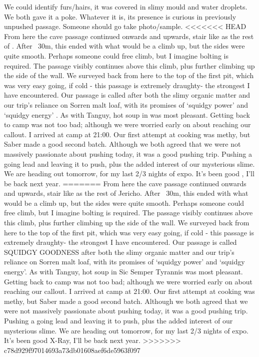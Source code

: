 We could identify furs/hairs, it was covered in slimy mould and water droplets. We both gave it a poke. Whatever it is, its presence is curious in previously unpushed passage. Someone should go take photo/sample.
<<<<<<< HEAD
From here the cave passage continued onwards and upwards, stair like as the rest of . After ~30m, this ended with what would be a climb up, but the sides were quite smooth. Perhaps someone could free climb, but I imagine bolting is required. The passage visibly continues above this climb, plus further climbing up the side of the wall. We surveyed back from here to  the top of the first pit, which was very easy going, if cold  - this passage is extremely draughty- the strongest I have encountered. Our passage is called   after both the slimy organic matter and our trip’s reliance on Sorren malt loaf, with its promises of ‘squidgy power’ and ‘squidgy energy’ . As with Tanguy, hot soup in  was most pleasant.
Getting back to camp was not too bad; although we were worried early on about reaching our callout. I arrived at camp at 21:00. Our first attempt at cooking was methy, but Saber made a good second batch. Although we both agreed that we were not massively passionate about pushing today, it was a good pushing trip. Pushing a going lead and leaving it to push, plus the added interest of our mysterious slime.
We are heading out tomorrow, for my last 2/3 nights of expo. It’s been good , I’ll be back next year.
=======
From here the cave passage continued onwards and upwards, stair like as the rest of Jericho. After ~30m, this ended with what would be a climb up, but the sides were quite smooth. Perhaps someone could free climb, but I imagine bolting is required. The passage visibly continues above this climb, plus further climbing up the side of the wall. We surveyed back from here to  the top of the first pit, which was very easy going, if cold  - this passage is extremely draughty- the strongest I have encountered. Our passage is called SQUIDGY GOODNESS after both the slimy organic matter and our trip's reliance on Sorren malt loaf, with its promises of `squidgy power' and `squidgy energy'. As with Tanguy, hot soup in Sic Semper Tyrannis was most pleasant.
Getting back to camp was not too bad; although we were worried early on about reaching our callout. I arrived at camp at 21:00. Our first attempt at cooking was methy, but Saber made a good second batch. Although we both agreed that we were not massively passionate about pushing today, it was a good pushing trip. Pushing a going lead and leaving it to push, plus the added interest of our mysterious slime.
We are heading out tomorrow, for my last 2/3 nights of expo. It's been good X-Ray, I'll be back next year.
>>>>>>> c78d929f97014693a73db01608aef6de5963f097

